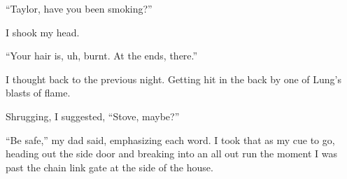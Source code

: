 ``Taylor, have you been smoking?''



I shook my head.



``Your hair is, uh, burnt.  At the ends, there.''



I thought back to the previous night.  Getting hit in the back by one of Lung's blasts of flame.



Shrugging, I suggested, ``Stove, maybe?''



``Be safe,'' my dad said, emphasizing each word.  I took that as my cue to go, heading out the side door and breaking into an all out run the moment I was past the chain link gate at the side of the house.





